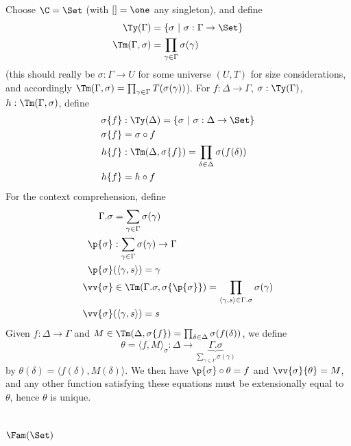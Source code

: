 \documentclass{article}
\begin{document}
Choose $\C = \Set$ (with $[] = \one$ any singleton), and define
\begin{align*}
  \Ty(\Gamma) &= \{ \sigma\ |\ \sigma : \Gamma \to \Set\} \\
  \Tm(\Gamma, \sigma) &= \prod_{\gamma \in \Gamma}\sigma(\gamma)
\end{align*}
(this should really be $\sigma : \Gamma \to U$ for some universe $(U,
T)$  for size considerations, and accordingly $\Tm(\Gamma, \sigma) = \prod_{\gamma \in
  \Gamma}T(\sigma(\gamma))$).  For $f : \Delta \to \Gamma$, $\sigma :
\Ty(\Gamma)$, $h : \Tm(\Gamma, \sigma)$, define
\begin{align*}
  \sigma\{f\} &: \Ty(\Delta) = \{ \sigma\ |\ \sigma : \Delta \to \Set\} \\
  \sigma\{f\} &= \sigma \circ f \\
  h\{f\} &: \Tm(\Delta, \sigma\{f\}) = \prod_{\delta \in \Delta}\sigma(f(\delta)) \\
  h\{f\} &= h \circ f
\end{align*}
For the context comprehension, define
\begin{align*}
  \Gamma.\sigma &= \sum_{\gamma \in \Gamma}\sigma(\gamma) \\
  \p{\sigma} &: \sum_{\gamma \in \Gamma}\sigma(\gamma) \to \Gamma \\
  \p{\sigma}&(\langle \gamma, s\rangle ) = \gamma \\
  \vv{\sigma} &\in \Tm(\Gamma.\sigma, \sigma\{\p{\sigma}\}) = \prod_{\langle \gamma, s \rangle \in \Gamma.\sigma} \sigma(\gamma) \\
  \vv{\sigma}&(\langle \gamma, s\rangle ) = s
\end{align*}
Given $f : \Delta \to \Gamma$ and $M \in \Tm(\Delta, \sigma\{f\}) =
\prod_{\delta \in \Delta}\sigma(f(\delta))$, we define
\[
\theta = \langle f, M\rangle_{\sigma} : \Delta \to \underbrace{\Gamma.\sigma}_{\displaystyle\sum_{\gamma \in \Gamma}\sigma(\gamma)}
\]
by $\theta(\delta) = \langle f(\delta), M(\delta)\rangle$. We then have
$\p{\sigma} \circ \theta = f$ and $\vv{\sigma}\{\theta\} = M$, and any
other function satisfying these equations must be extensionally equal
to $\theta$, hence $\theta$ is unique.


\section{$\Fam(\Set)$}
\label{cwfFamSet}
\end{document}
